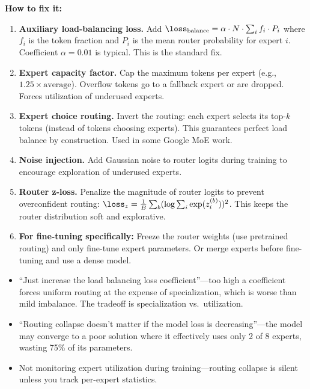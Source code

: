 \begin{interviewq}
\textbf{How to fix it:}
\begin{enumerate}
    \item \textbf{Auxiliary load-balancing loss.} Add $\loss_{\text{balance}} = \alpha \cdot N \cdot \sum_i f_i \cdot P_i$ where $f_i$ is the token fraction and $P_i$ is the mean router probability for expert $i$. Coefficient $\alpha = 0.01$ is typical. This is the standard fix.
    \item \textbf{Expert capacity factor.} Cap the maximum tokens per expert (e.g., $1.25 \times \text{average}$). Overflow tokens go to a fallback expert or are dropped. Forces utilization of underused experts.
    \item \textbf{Expert choice routing.} Invert the routing: each expert selects its top-$k$ tokens (instead of tokens choosing experts). This guarantees perfect load balance by construction. Used in some Google MoE work.
    \item \textbf{Noise injection.} Add Gaussian noise to router logits during training to encourage exploration of underused experts.
    \item \textbf{Router z-loss.} Penalize the magnitude of router logits to prevent overconfident routing: $\loss_z = \frac{1}{B} \sum_b (\log \sum_i \exp(z_i^{(b)}))^2$. This keeps the router distribution soft and explorative.
    \item \textbf{For fine-tuning specifically:} Freeze the router weights (use pretrained routing) and only fine-tune expert parameters. Or merge experts before fine-tuning and use a dense model.
\end{enumerate}

\redflags
\begin{itemize}
    \item ``Just increase the load balancing loss coefficient''---too high a coefficient forces uniform routing at the expense of specialization, which is worse than mild imbalance. The tradeoff is specialization vs.\ utilization.
    \item ``Routing collapse doesn't matter if the model loss is decreasing''---the model may converge to a poor solution where it effectively uses only 2 of 8 experts, wasting 75\% of its parameters.
    \item Not monitoring expert utilization during training---routing collapse is silent unless you track per-expert statistics.
\end{itemize}



\end{interviewq}
